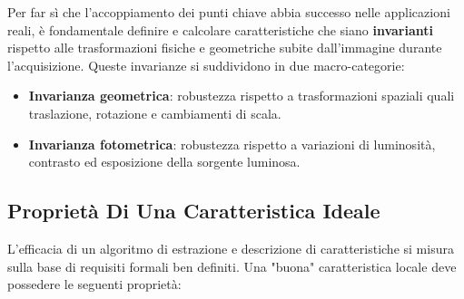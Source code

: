 ﻿\documentclass[11pt, a4paper]{article}
\begin{document}
Per far sì che l'accoppiamento dei punti chiave abbia successo nelle applicazioni reali, è fondamentale definire e calcolare caratteristiche che siano \textbf{invarianti} rispetto alle trasformazioni fisiche e geometriche subite dall'immagine durante l'acquisizione. Queste invarianze si suddividono in due macro-categorie:
\begin{itemize}[noitemsep]
    \item \textbf{Invarianza geometrica}: robustezza rispetto a trasformazioni spaziali quali traslazione, rotazione e cambiamenti di scala.
    \item \textbf{Invarianza fotometrica}: robustezza rispetto a variazioni di luminosità, contrasto ed esposizione della sorgente luminosa.
\end{itemize}


\subsection{Proprietà Di Una Caratteristica Ideale}

L'efficacia di un algoritmo di estrazione e descrizione di caratteristiche si misura sulla base di requisiti formali ben definiti. Una "buona" caratteristica locale deve possedere le seguenti proprietà:
\end{document}
